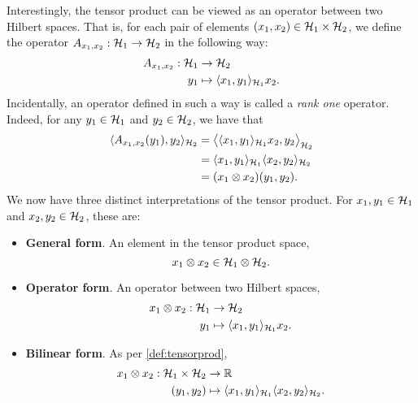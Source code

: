 Interestingly, the tensor product can be viewed as an operator between two Hilbert spaces.
That is, for each pair of elements $(x_1,x_2) \in {\mathcal H}_1\times{\mathcal H}_2$, we define the operator $A_{x_1,x_2}:{\mathcal H}_1\to{\mathcal H}_2$ in the following way:
\begingroup
\setlength{\abovedisplayskip}{7pt}
\setlength{\belowdisplayskip}{7pt}
\begin{align*}
  A_{x_1,x_2}:{\mathcal H}_1&\to{\mathcal H}_2 \\
  y_1&\mapsto \langle x_1,y_1\rangle_{{\mathcal H}_1}x_2.
\end{align*}
\endgroup
Incidentally, an operator defined in such a way is called a \emph{rank one} operator.
Indeed, for any $y_1\in{\mathcal H}_1$ and $y_2\in{\mathcal H}_2$, we have that
\begingroup
\setlength{\abovedisplayskip}{7pt}
\setlength{\belowdisplayskip}{6pt}
\begin{align*}
  \langle A_{x_1,x_2}(y_1),y_2\rangle_{{\mathcal H}_2} 
  &= \big\langle \langle x_1,y_1\rangle_{{\mathcal H}_1}x_2 , y_2 \big\rangle_{{\mathcal H}_2} \\
  &= \langle x_1,y_1\rangle_{{\mathcal H}_1}\langle x_2,y_2\rangle_{{\mathcal H}_2} \\
  &= (x_1\otimes x_2)(y_1,y_2). 
\end{align*}
\endgroup
We now have three distinct interpretations of the tensor product.
For $x_1,y_1\in{\mathcal H}_1$ and $x_2,y_2\in{\mathcal H}_2$, these are:
\begingroup
\setlength{\abovedisplayskip}{5pt}
\setlength{\belowdisplayskip}{5pt}
\begin{itemize}
  \item \textbf{General form}. An element in the tensor product space,
  \[
    x_1 \otimes x_2 \in {\mathcal H}_1 \otimes {\mathcal H}_2.
  \]
  \item \textbf{Operator form}. An operator between two Hilbert spaces,
  \begin{align*}
    x_1 \otimes x_2:{\mathcal H}_1 &\to {\mathcal H}_2 \\
    y_1 &\mapsto \langle x_1,y_1\rangle_{{\mathcal H}_1}x_2 .
  \end{align*}  
  \item \textbf{Bilinear form}. As per \cref{def:tensorprod},
  \begin{align*}
    x_1 \otimes x_2:{\mathcal H}_1 \times {\mathcal H}_2 &\to \mathbb{R} \\
    (y_1,y_2) &\mapsto \langle x_1,y_1\rangle_{{\mathcal H}_1}\langle x_2,y_2\rangle_{{\mathcal H}_2}.
  \end{align*}
\end{itemize}
\endgroup

